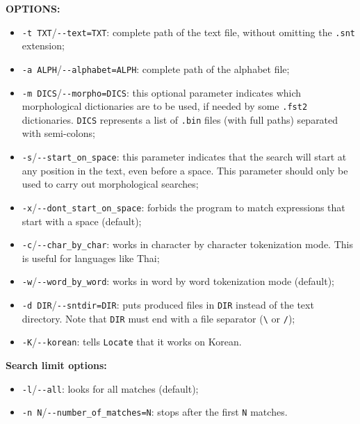 \bigskip
\noindent \textbf{OPTIONS:}
\begin{itemize}
  \item \verb+-t TXT+/\verb+--text=TXT+: complete path of the text file, without omitting
  the \verb+.snt+ extension;

  \item \verb+-a ALPH+/\verb+--alphabet=ALPH+: complete path of the alphabet
  file;
  
  \item \verb+-m DICS+/\verb+--morpho=DICS+: this optional parameter indicates
  which morphological dictionaries are to be used, if needed by some \verb+.fst2+
  dictionaries. \verb+DICS+ represents a list of \verb+.bin+ files (with full
  paths) separated with semi-colons;
  
  \item \verb+-s+/\verb+--start_on_space+: this parameter indicates that the
  search will start at any position in the text, even before a space. This 
  parameter should only be used to carry out morphological searches;
  
  \item \verb+-x+/\verb+--dont_start_on_space+: forbids the program to match
  expressions that start with a space (default);
  
  \item \verb+-c+/\verb+--char_by_char+: works in character by character
  tokenization mode. This is useful for languages like Thai;
  
  \item \verb+-w+/\verb+--word_by_word+: works in word by word
  tokenization mode (default);
  
  \item \verb+-d DIR+/\verb+--sntdir=DIR+: puts produced files in \verb+DIR+
  instead of the text directory. Note that \verb+DIR+ must end with a file separator
  (\verb+\+ or \verb+/+);
  
  \item \verb+-K+/\verb+--korean+: tells \verb+Locate+ that it works on Korean.
  
\end{itemize}

\bigskip
\noindent \textbf{Search limit options:}
\begin{itemize}
  \item \verb+-l+/\verb+--all+: looks for all matches (default);
  \item \verb+-n N+/\verb+--number_of_matches=N+: stops after the first
  \verb+N+ matches.
\end{itemize}

